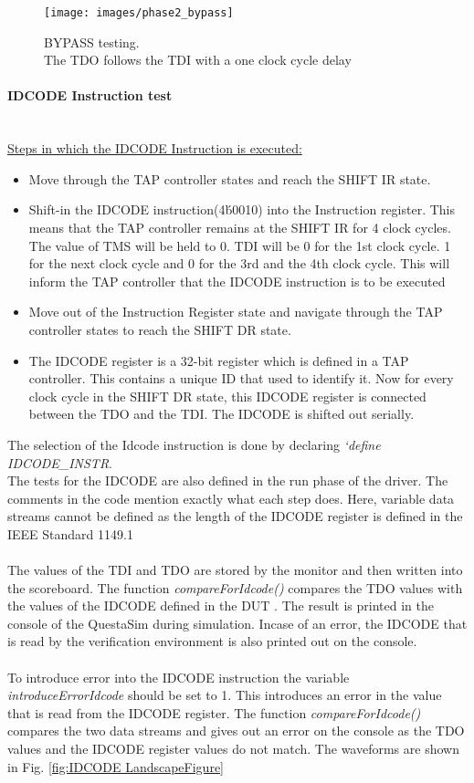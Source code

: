 \documentclass[a4paper,11pt]{article}
\begin{document}
\begin{sidewaysfigure}[ht]
\centering
\texttt{[image: images/phase2\_bypass]}
\caption{BYPASS testing.\\ The TDO follows the TDI with a one clock cycle delay}
\label{fig:Bypass LandscapeFigure}
\end{sidewaysfigure}

\FloatBarrier
\paragraph{IDCODE Instruction test}\mbox{}\\
\underline{Steps in which the IDCODE Instruction is executed:}
\begin{itemize}[noitemsep]
\item Move through the TAP controller states and reach the SHIFT IR state.
\item Shift-in the IDCODE instruction(4\'b0010) into the Instruction register. This means that the TAP controller remains at the SHIFT IR for 4 clock cycles. The value of TMS will be held to 0. TDI will be 0 for the 1st clock cycle. 1 for the next clock cycle and 0 for the 3rd and the 4th clock cycle. This will inform the TAP controller that the IDCODE instruction is to be executed
\item Move out of the Instruction Register state and navigate through the TAP controller states to reach the SHIFT DR state.
\item The IDCODE register is a 32-bit register which is defined in a TAP controller. This contains a unique ID that used to identify it. Now for every clock cycle in the SHIFT DR state, this IDCODE register is connected between the TDO and the TDI. The IDCODE is shifted out serially.
\end{itemize}

The selection of the Idcode instruction is done by declaring \textit{`define IDCODE\_INSTR}.\\
The tests for the IDCODE are also defined in the run phase of the driver. The comments in the code mention exactly what each step does. Here, variable data streams cannot be defined as the length of the IDCODE register is defined in the IEEE Standard 1149.1\\
 \\
The values of the TDI and TDO are stored by the monitor and then written into the scoreboard. The function \textit{compareForIdcode()} compares the TDO values with the values of the IDCODE defined in the DUT . The result is printed in the console of the QuestaSim during simulation. Incase of an error, the IDCODE that is read by the verification environment is also printed out on the console. \\
 \\
 To introduce error into the IDCODE instruction the variable \textit{introduceErrorIdcode} should be set to 1. This introduces an error in the value that is read from the IDCODE register. The function \textit{compareForIdcode()} compares the two data streams and gives out an error on the console as the TDO values and the IDCODE register values do not match. The waveforms are shown in Fig. \ref{fig:IDCODE LandscapeFigure}
\end{document}
